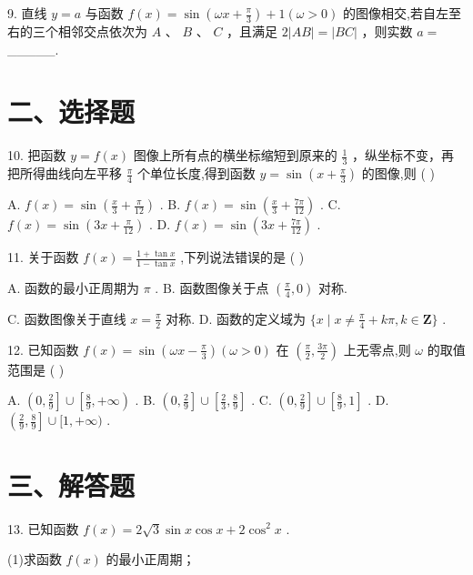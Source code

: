 9. 直线 $y = a$ 与函数 $f\left( x\right)  = \sin \left( {{\omega x} + \frac{\pi }{3}}\right)  + 1\left( {\omega  > 0}\right)$ 的图像相交,若自左至右的三个相邻交点依次为 $A\text{ 、 }B\text{ 、 }C$ ，且满足 $2\left| {AB}\right|  = \left| {BC}\right|$ ，则实数 $a =$ \_\_\_\_\_.

\section*{二、选择题}

10. 把函数 $y = f\left( x\right)$ 图像上所有点的横坐标缩短到原来的 $\frac{1}{3}$ ，纵坐标不变，再把所得曲线向左平移 $\frac{\pi }{4}$ 个单位长度,得到函数 $y = \sin \left( {x + \frac{\pi }{3}}\right)$ 的图像,则 ( )

A. $f\left( x\right)  = \sin \left( {\frac{x}{3} + \frac{\pi }{12}}\right)$ . B. $f\left( x\right)  = \sin \left( {\frac{x}{3} + \frac{7\pi }{12}}\right)$ . C. $f\left( x\right)  = \sin \left( {{3x} + \frac{\pi }{12}}\right)$ . D. $f\left( x\right)  = \sin \left( {{3x} + \frac{7\pi }{12}}\right)$ .

11. 关于函数 $f\left( x\right)  = \frac{1 + \tan x}{1 - \tan x}$ ,下列说法错误的是 ( )

A. 函数的最小正周期为 $\pi$ . B. 函数图像关于点 $\left( {\frac{\pi }{4},0}\right)$ 对称.

C. 函数图像关于直线 $x = \frac{\pi }{2}$ 对称. D. 函数的定义域为 $\{ x \mid  x \neq  \frac{\pi }{4} + {k\pi },k \in  \mathbf{Z}\}$ .

12. 已知函数 $f\left( x\right)  = \sin \left( {{\omega x} - \frac{\pi }{3}}\right) \left( {\omega  > 0}\right)$ 在 $\left( {\frac{\pi }{2},\frac{3\pi }{2}}\right)$ 上无零点,则 $\omega$ 的取值范围是 ( )

A. $\left( {0,\frac{2}{9}}\right\rbrack   \cup  \left\lbrack  {\frac{8}{9}, + \infty }\right)$ . B. $\left( {0,\frac{2}{9}}\right\rbrack   \cup  \left\lbrack  {\frac{2}{3},\frac{8}{9}}\right\rbrack$ . C. $\left( {0,\frac{2}{9}}\right\rbrack   \cup  \left\lbrack  {\frac{8}{9},1}\right\rbrack$ . D. $\left( {\frac{2}{9},\frac{8}{9}}\right\rbrack   \cup  \lbrack 1, + \infty )$ .

\section*{三、解答题}

13. 已知函数 $f\left( x\right)  = 2\sqrt{3}\sin x\cos x + 2{\cos }^{2}x$ .

(1)求函数 $f\left( x\right)$ 的最小正周期；

